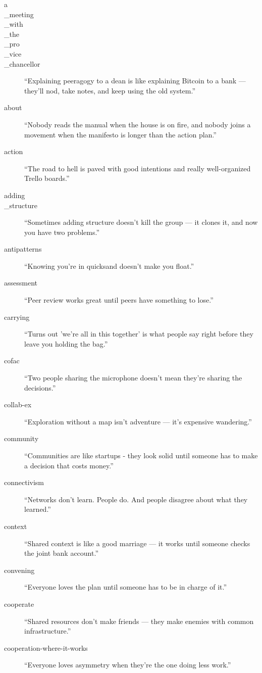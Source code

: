 \documentclass[11pt,a4paper]{article}
\begin{document}
\begin{description}
  \item[a\\_meeting\\_with\\_the\\_pro\\_vice\\_chancellor] ``Explaining peeragogy to a dean is like explaining Bitcoin to a bank — they'll nod, take notes, and keep using the old system.''
  \item[about] ``Nobody reads the manual when the house is on fire, and nobody joins a movement when the manifesto is longer than the action plan.''
  \item[action] ``The road to hell is paved with good intentions and really well-organized Trello boards.''
  \item[adding\\_structure] ``Sometimes adding structure doesn't kill the group — it clones it, and now you have two problems.''
  \item[antipatterns] ``Knowing you're in quicksand doesn't make you float.''
  \item[assessment] ``Peer review works great until peers have something to lose.''
  \item[carrying] ``Turns out 'we're all in this together' is what people say right before they leave you holding the bag.''
  \item[cofac] ``Two people sharing the microphone doesn't mean they're sharing the decisions.''
  \item[collab-ex] ``Exploration without a map isn't adventure — it's expensive wandering.''
  \item[community] ``Communities are like startups - they look solid until someone has to make a decision that costs money.''
  \item[connectivism] ``Networks don't learn. People do. And people disagree about what they learned.''
  \item[context] ``Shared context is like a good marriage — it works until someone checks the joint bank account.''
  \item[convening] ``Everyone loves the plan until someone has to be in charge of it.''
  \item[cooperate] ``Shared resources don't make friends — they make enemies with common infrastructure.''
  \item[cooperation-where-it-works] ``Everyone loves asymmetry when they're the one doing less work.''

\end{description}
\end{document}

